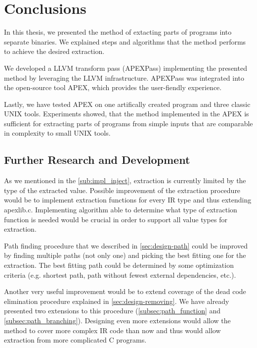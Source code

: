 \documentclass[12pt, twoside]{fithesis2}
\renewcommand{\_}{\leavevmode \kern0.07em\vbox{\hrule width0.4em}}
\begin{document}
\chapter{Conclusions}
\label{chap:conclusions}

In this thesis, we presented the method of extacting parts of programs into
separate binaries. We explained steps and algorithms that the method
performs to achieve the desired extraction.

We developed a LLVM transform pass (APEXPass) implementing the presented
method by leveraging the LLVM infrastructure.
APEXPass was integrated into the open-source tool APEX, which provides the
user-fiendly experience.

Lastly, we have tested APEX on one artifically created program and three
classic UNIX tools. Experiments showed, that the method implemented in the APEX
is sufficient for extracting parts of programs from simple inputs that are
comparable in complexity to small UNIX tools.



\section{Further Research and Development}
\label{sec:conclusions-next}


As we mentioned in the \autoref{sub:impl_inject}, extraction is currently
limited by the type of the extracted value.
Possible improvement of the extraction procedure would be to implement
extraction functions for every IR type and thus extending apexlib.c.
Implementing algorithm able to determine what type of extraction
function is needed would be crucial in order to support all value types
for extraction.

Path finding procedure that we described in \autoref{sec:design-path} could be
improved by finding multiple paths (not only one) and picking the best fitting
one for the extraction. The best fitting path could be determined by some
optimization criteria (e.g. shortest path, path without fewest external
dependencies, etc.).

Another very useful improvement would be to extend coverage of the dead
code elimination procedure explained in \autoref{sec:design-removing}.
We have already presented two extensions to this procedure
(\autoref{subsec:path_function} and \autoref{subsec:path_branching}).
Designing even more extensions would allow the method to cover more
complex IR code than now and thus would allow extraction from more complicated
C programs.
\end{document}
